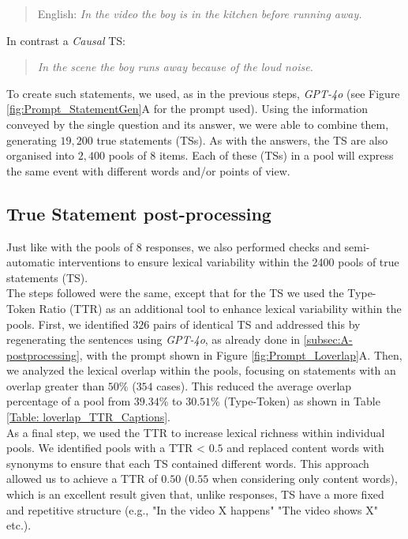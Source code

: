 \begin{quote}
    English:
    \textit{In the video the boy is in the kitchen before running away.}
\end{quote}
In contrast a \textit{Causal} TS:
\begin{quote}
    \textit{In the scene the boy runs away because of the loud noise.}
\end{quote}

To create such statements, we used, as in the previous steps, \textit{GPT-4o} (see Figure \ref{fig:Prompt_StatementGen}A for the prompt used). Using the information conveyed by the single question and its answer, we were able to combine them, generating $19,200$ true statements (TSs). As with the answers, the TS are also organised into $2,400$ pools of $8$ items. Each of these (TSs) in a pool will express the same event with different words and/or points of view. 



\subsection{True Statement post-processing}
Just like with the pools of 8 responses, we also performed checks and semi-automatic interventions to ensure lexical variability within the 2400 pools of true statements (TS).\\ The steps followed were the same, except that for the TS we used the Type-Token Ratio (TTR) as an additional tool to enhance lexical variability within the pools. First, we identified $326$ pairs of identical TS and addressed this by regenerating the sentences using \textit{GPT-4o}, as already done in \ref{subsec:A-postprocessing}, with the prompt shown in Figure \ref{fig:Prompt_Loverlap}A. Then, we analyzed the lexical overlap within the pools, focusing on statements with an overlap greater than $50$\% ($354$ cases). This reduced the average overlap percentage of a pool from $39.34$\% to $30.51$\% (Type-Token) as shown in Table \ref{Table: loverlap_TTR_Captions}.\\
\noindent As a final step, we used the TTR to increase lexical richness within individual pools. We identified pools with a TTR < $0.5$ and replaced content words with synonyms to ensure that each TS contained different words. This approach allowed us to achieve a TTR of $0.50$ ($0.55$ when considering only content words), which is an excellent result given that, unlike responses, TS have a more fixed and repetitive structure (e.g., "In the video X happens" "The video shows X" etc.).


